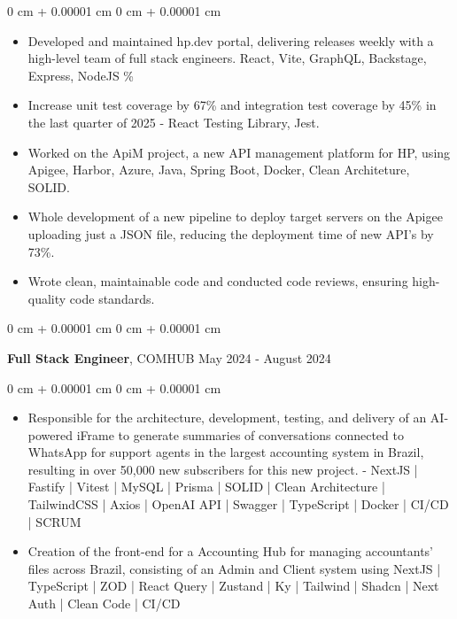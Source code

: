 \documentclass[10pt, letterpaper]{article}
\newenvironment{highlights}{ \begin{itemize}[ topsep=0.10 cm, parsep=0.10 cm, partopsep=0pt,
itemsep=0pt, leftmargin=0 cm + 10pt ] }{ \end{itemize} } %
\newenvironment{onecolentry}{ \begin{adjustwidth}{ 0 cm + 0.00001 cm }{ 0 cm + 0.00001 cm }
}{ \end{adjustwidth} } %
\newenvironment{twocolentry}[2][]{ \onecolentry \def\secondColumn{#2} \setcolumnwidth{\fill, 4.5 cm}
\begin{paracol}{2} }{ \switchcolumn \raggedleft \secondColumn \end{paracol}
\endonecolentry } %
\begin{document}
	\vspace{0.10 cm}
	\begin{onecolentry}
		\begin{highlights}
			\item Developed and maintained hp.dev portal, delivering releases weekly with a high-level team of full stack engineers. React, Vite, GraphQL, Backstage, Express, NodeJS \%
			\item Increase unit test coverage by 67\% and integration test coverage by 45\% in the last quarter of 2025 - React Testing Library, Jest.
			\item Worked on the ApiM project, a new API management platform for HP, using Apigee, Harbor, Azure, Java, Spring Boot, Docker, Clean Architeture, SOLID.
            \item Whole development of a new pipeline to deploy target servers on the Apigee uploading just a JSON file, reducing the deployment time of new API's by 73\%.
			\item Wrote clean, maintainable code and conducted code reviews, ensuring high-quality code standards.
		\end{highlights}
	\end{onecolentry}
	
	\vspace{0.2 cm}
	
	\begin{twocolentry}
		{ May 2024 - August 2024 } \textbf{Full Stack Engineer}, COMHUB
	\end{twocolentry}
	
	\vspace{0.10 cm}
	\begin{onecolentry}
		\begin{highlights}
			\item Responsible for the architecture, development, testing, and delivery of an AI-powered iFrame to generate summaries of
            conversations connected to WhatsApp for support agents in the largest accounting system in Brazil, resulting in over 50,000 new
            subscribers for this new project. - NextJS | Fastify | Vitest | MySQL | Prisma | SOLID | Clean Architecture | TailwindCSS | Axios |
            OpenAI API | Swagger | TypeScript | Docker | CI/CD | SCRUM
			\item Creation of the front-end for a Accounting Hub for managing accountants' files across Brazil, consisting of an Admin and Client
            system using NextJS | TypeScript | ZOD | React Query | Zustand | Ky | Tailwind | Shadcn | Next Auth | Clean Code | CI/CD
		\end{highlights}
	\end{onecolentry}
	
\end{document}
